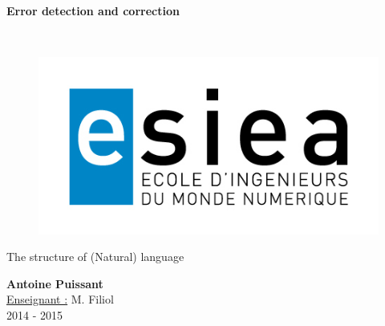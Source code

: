 \begin{titlepage}
      \begin{center}   
        \Huge
        \textbf{Error detection and correction}
        
        \LARGE
        ~
        
        
        \vfill
        \begin{figure}[H]
	    \centering
	    \begin{minipage}{0.9\textwidth}
		\centering
		\includegraphics[width=\textwidth]{./img/esiea.jpeg}
	    \end{minipage}\hfill
	\end{figure}
        \vfill
        
        \vspace{0.5cm}
        
        The structure of (Natural) language
        
        \vspace{2cm}
        \textbf{Antoine Puissant}\\
        \vspace{0.8cm}
        \Large
        \underline{Enseignant :} M. Filiol\\
        \vspace{0.5cm}
        2014 - 2015%
        
    \end{center}
\end{titlepage}